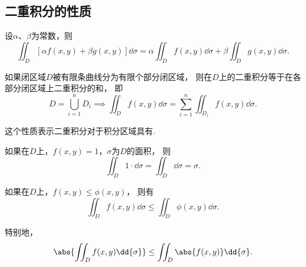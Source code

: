 \subsection{二重积分的性质}
\begin{property}\label{theorem:重积分.二重积分的性质1}
设\(\alpha\)、\(\beta\)为常数，则\[
\iint_D [\alpha f(x,y)+\beta g(x,y)] \dd{\sigma}
=\alpha \iint_D f(x,y) \dd{\sigma}
+\beta \iint_D g(x,y) \dd{\sigma}.
\]
\end{property}

\begin{property}\label{theorem:重积分.二重积分的性质2}
如果闭区域\(D\)被有限条曲线分为有限个部分闭区域，
则在\(D\)上的二重积分等于在各部分闭区域上二重积分的和，
即\[
	D = \bigcup_{i=1}^n D_i
	\implies
	\iint_D f(x,y) \dd{\sigma}
	= \sum_{i=1}^n \iint_{D_i} f(x,y) \dd{\sigma}.
\]
\end{property}
这个性质表示二重积分对于积分区域具有.

\begin{property}\label{theorem:重积分.二重积分的性质3}
如果在\(D\)上，\(f(x,y)=1\)，\(\sigma\)为\(D\)的面积，
则\[
	\iint_D 1\cdot\dd{\sigma}
	=\iint_D \dd{\sigma}
	=\sigma.
\]
\end{property}

\begin{property}\label{theorem:重积分.二重积分的性质4}
如果在\(D\)上，\(f(x,y) \leq \phi(x,y)\)，
则有\[
	\iint_D f(x,y) \dd{\sigma} \leq \iint_D \phi(x,y) \dd{\sigma}.
\]

特别地，\[
	\abs{\iint_D f(x,y) \dd{\sigma}} \leq \iint_D \abs{f(x,y)} \dd{\sigma}.
\]
\end{property}

